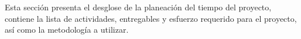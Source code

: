 %

Esta sección presenta el desglose de la planeación del tiempo del proyecto, 
contiene la lista de actividades, entregables y esfuerzo requerido para el 
proyecto, así como la metodología a utilizar.
